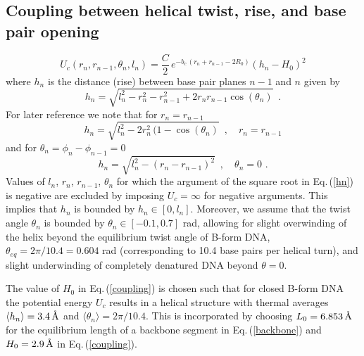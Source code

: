 \documentclass[12pt,masters,final]{UTRGVthesis}
\begin{document}
\subsection{Coupling between helical twist, rise, and base pair opening}
%
  \begin{equation} \label{coupling}
    U_c(r_n,r_{n-1},\theta_n,l_n) = \frac{C}{2} \, e^{-b_c \, (r_n + r_{n-1} - 2 R_0)} \left(h_n - H_0 \right)^2
  \end{equation}   
  where $h_n$ is the distance (rise) between base pair planes $n-1$ and $n$ given by
  \begin{equation} \label{hn}
  h_n = \sqrt{l_n^2 - r_n^2 - r_{n-1}^2 + 2 r_n r_{n-1} \cos(\theta_n)} \, \, \, .
  \end{equation}    
  For later reference we note that for $r_n = r_{n-1}$
  \begin{equation} \label{hnrr}
    h_n = \sqrt{l_n^2 - 2 r_n^2 \, (1 - \cos(\theta_n)} \, \, \, , \quad r_n = r_{n-1} 
  \end{equation}
  and for $\theta_n = \phi_n - \phi_{n-1} = 0$
  \begin{equation} \label{hntheta0}
    h_n = \sqrt{l_n^2 - (r_n - r_{n-1})^2} \, \, \, , \quad \theta_n = 0 \, \, .
  \end{equation}  
  Values of $l_n$, $r_n$, $r_{n-1}$, $\theta_n$ for which the argument of the square root
  in Eq.\,(\ref{hn}) is negative are excluded by imposing $U_c = \infty$ for negative
  arguments. This implies that $h_n$ is bounded by $h_n \in [0, l_n]$. Moreover, 
  we assume that the twist angle $\theta_n$ is bounded by $\theta_n \in [-0.1, 0.7]$ rad,
  allowing for slight overwinding of the helix
  beyond the equilibrium twist angle of B-form DNA,
  $\theta_{eq} = 2 \pi / 10.4 = 0.604$ rad (corresponding to 10.4 base pairs per helical turn),
  and slight underwinding of completely denatured DNA beyond $\theta = 0$.

  The value of $H_0$ in Eq.\,(\ref{coupling}) is chosen such that for closed B-form DNA
  the potential energy $U_c$ results in a helical structure with thermal averages
  $\langle h_n \rangle = 3.4 \, \text{\normalfont\AA}$ and $\langle \theta_n \rangle = 2 \pi / 10.4$.
  This is incorporated by choosing
  $L_0 = 6.853 \, \text{\normalfont\AA}$ for the equilibrium length of a backbone segment in
  Eq.\,(\ref{backbone}) and $H_0 = 2.9 \, \text{\normalfont\AA}$ in Eq.\,(\ref{coupling}).
\end{document}
